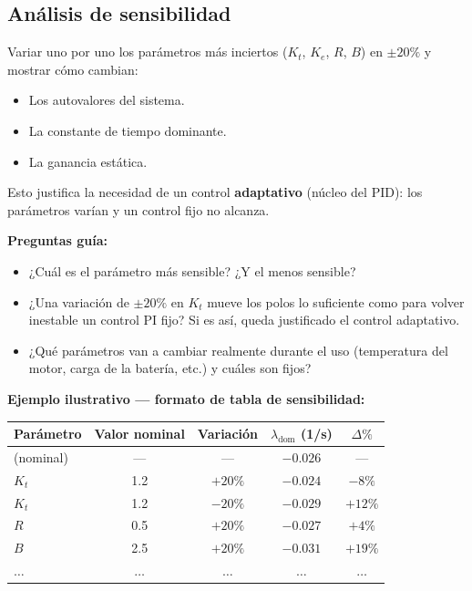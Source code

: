 \documentclass[11pt,a4paper]{article}
\begin{document}
\subsection{Análisis de sensibilidad}

Variar uno por uno los parámetros más inciertos ($K_t$, $K_e$, $R$, $B$) en $\pm 20\%$ y mostrar cómo cambian:

\begin{itemize}
    \item Los autovalores del sistema.
    \item La constante de tiempo dominante.
    \item La ganancia estática.
\end{itemize}

Esto justifica la necesidad de un control \textbf{adaptativo} (núcleo del PID): los parámetros varían y un control fijo no alcanza.

\begin{guia}
\textbf{Preguntas guía:}
\begin{itemize}
    \item ¿Cuál es el parámetro más sensible? ¿Y el menos sensible?
    \item ¿Una variación de $\pm 20\%$ en $K_t$ mueve los polos lo suficiente como para volver inestable un control PI fijo? Si es así, queda justificado el control adaptativo.
    \item ¿Qué parámetros van a cambiar realmente durante el uso (temperatura del motor, carga de la batería, etc.) y cuáles son fijos?
\end{itemize}
\end{guia}

\begin{ejemplo}
\textbf{Ejemplo ilustrativo --- formato de tabla de sensibilidad:}

\begin{table}[h]
\centering
\begin{tabular}{lcccc}
\toprule
Parámetro & Valor nominal & Variación & $\lambda_{\text{dom}}$ (1/s) & $\Delta\%$ \\
\midrule
(nominal) & ---  & ---       & $-0.026$ & ---   \\
$K_t$     & 1.2  & $+20\%$   & $-0.024$ & $-8\%$  \\
$K_t$     & 1.2  & $-20\%$   & $-0.029$ & $+12\%$ \\
$R$       & 0.5  & $+20\%$   & $-0.027$ & $+4\%$  \\
$B$       & 2.5  & $+20\%$   & $-0.031$ & $+19\%$ \\
$\dots$   & $\dots$ & $\dots$ & $\dots$ & $\dots$ \\
\bottomrule
\end{tabular}
\end{table}
\end{ejemplo}
\end{document}

